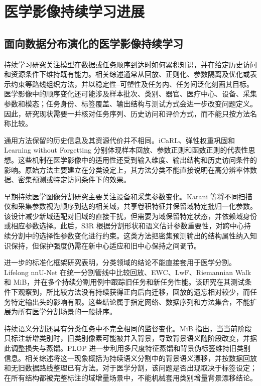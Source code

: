 \section{医学影像持续学习进展}
\label{sec:intro-related-work}

\subsection{面向数据分布演化的医学影像持续学习}
\label{subsec:intro-medical-continual-learning}

持续学习研究关注模型在数据或任务顺序到达时如何累积知识，并在给定历史访问和资源条件下维持既有能力。相关综述通常从回放、正则化、参数隔离及优化或表示约束等路线组织方法，并以稳定性--可塑性及任务内、任务间泛化刻画其目标\cite{delange2022continual,wang2024continualsurvey}。医学影像中的顺序变化还可能涉及样本批次、类别、器官、医疗中心、设备、采集参数和模态；任务身份、标签覆盖、输出结构与测试方式会进一步改变问题定义\cite{kumari2025medicalcl}。因此，研究现状需要一并核对任务序列、历史访问和评价方式，而不能只按方法名称比较。

通用方法保留的历史信息及其资源代价并不相同。iCaRL、弹性权重巩固和 Learning without Forgetting 分别体现样本回放、参数正则和函数正则的代表性思想\cite{rebuffi2017icarl,kirkpatrick2017ewc,li2018lwf}。这些机制在医学影像中的适用性还受到输入维度、输出结构和历史访问条件的影响。原始方法主要建立在分类设定上，其方法分类不能直接说明在高分辨率体数据、密集预测或特定访问条件下的效果。

早期持续医学图像分割研究主要关注设备和采集参数变化。Karani 等将不同扫描仪和采集参数视为顺序到达的相关域，共享卷积特征并保留域特定批归一化参数\cite{karani2018lifelong}。该设计减少新域适配对旧域的直接干扰，但需要为域保留特定状态，并依赖域身份或相应参数选择。此后，S3R 根据分割形状和语义估计参数重要性，对跨中心持续分割中的选择性参数变化进行约束\cite{zhang2023s3r}。这类方法把密集预测输出的结构属性纳入知识保持，但保护强度仍需在新中心适应和旧中心保持之间调节。

进一步的标准化框架研究表明，分类领域的结论不能直接套用于医学分割。Lifelong nnU-Net 在统一分割管线中比较回放、EWC、LwF、Riemannian Walk 和 MiB，并在多个持续分割用例中跟踪旧任务和新任务性能\cite{gonzalez2023lifelong}。该研究在其测试条件下观察到，所比较方法没有持续获得正向后向迁移，回放的遗忘相对较少，而任务特定输出头的影响有限。这些结论属于指定网络、数据序列和方法集合，不能扩展为所有医学分割场景的一般排序。

持续语义分割还具有分类任务中不完全相同的监督变化。MiB 指出，当当前阶段只标注新增类别时，旧类别像素可能被并入背景，导致背景语义随阶段改变，并据此调整损失与蒸馏\cite{cermelli2020mib}。PLOP 进一步利用多尺度特征蒸馏和背景伪标签维持旧类别信息\cite{douillard2021plop}。相关综述将这一现象概括为持续语义分割中的背景语义漂移，并按数据回放和无旧数据路线整理已有方法\cite{yuan2024continualseg}。对于医学分割，该问题是否出现取决于标签设定；在所有结构都被完整标注的域增量场景中，不能机械套用类别增量背景漂移结论。

